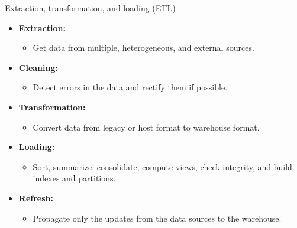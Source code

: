 \documentclass[aspectratio=169,t]{beamer}
\begin{document}
  { 
    \begin{frame}{Extraction, transformation, and loading (ETL)}
    \begin{itemize}
      \item \textbf{\color{airforceblue}Extraction:}
      \begin{itemize}
        \item Get data from multiple, heterogeneous, and external sources.
      \end{itemize}
      \item \textbf{\color{airforceblue}Cleaning:}
      \begin{itemize}
        \item Detect errors in the data and rectify them if possible.
      \end{itemize}
      \item \textbf{\color{airforceblue}Transformation:}
      \begin{itemize}
        \item Convert data from legacy or host format to warehouse format.
      \end{itemize}
      \item \textbf{\color{airforceblue}Loading:}
      \begin{itemize}
        \item Sort, summarize, consolidate, compute views, check integrity, and build indexes and partitions.
      \end{itemize}
      \item \textbf{\color{airforceblue}Refresh:}
      \begin{itemize}
        \item Propagate only the updates from the data sources to the warehouse.
      \end{itemize}
    \end{itemize}
    \end{frame}
  }
\end{document}
